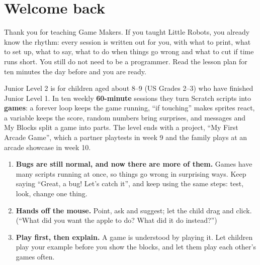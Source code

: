 \documentclass[track=junior,level=2,teacher]{kidscode}
\begin{document}
\tableofcontents

\section{Welcome back}
Thank you for teaching Game Makers. If you taught Little Robots, you already know the rhythm:
every session is written out for you, with what to print, what to set up, what to say, what to do
when things go wrong and what to cut if time runs short. You still do not need to be a programmer.
Read the lesson plan for ten minutes the day before and you are ready.

Junior Level 2 is for children aged about 8--9 (US Grades 2--3) who have finished Junior Level 1.
In ten weekly \textbf{60-minute} sessions they turn Scratch scripts into \textbf{games}: a forever
loop keeps the game running, \enquote{if touching} makes sprites react, a variable keeps the score,
random numbers bring surprises, and messages and My Blocks split a game into parts. The level ends
with a project, \enquote{My First Arcade Game}, which a partner playtests in week 9 and the family
plays at an arcade showcase in week 10.

\begin{teachernote}
\begin{enumerate}[itemsep=2pt]
  \item \textbf{Bugs are still normal, and now there are more of them.} Games have many scripts
        running at once, so things go wrong in surprising ways. Keep saying \enquote{Great, a bug!
        Let's catch it}, and keep using the same steps: test, look, change one thing.
  \item \textbf{Hands off the mouse.} Point, ask and suggest; let the child drag and click.
        (\enquote{What did you want the apple to do? What did it do instead?})
  \item \textbf{Play first, then explain.} A game is understood by playing it. Let children play
        your example before you show the blocks, and let them play each other's games often.
\end{enumerate}
\end{teachernote}
\end{document}
